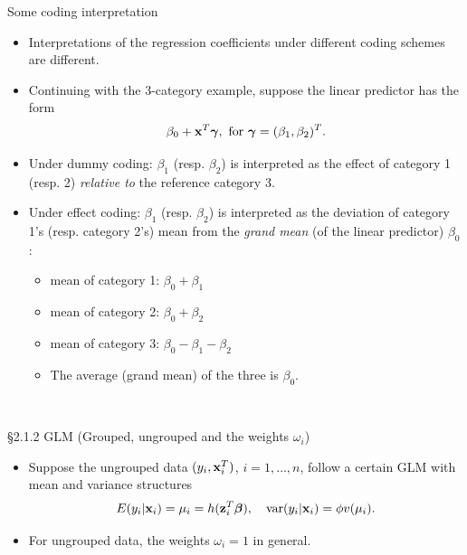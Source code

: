 \documentclass{beamer}
\newcommand{\boldgamma}{{\boldsymbol \gamma}}
\newcommand{\bx}{{\bf x}}
\newenvironment{wideitemize}%
  {\begin{itemize}%
    \setlength{\parskip}{1em}}%
  {\end{itemize}}
\begin{document}
\begin{frame}{Some coding interpretation}
\begin{wideitemize}
\item Interpretations of the regression coefficients under different coding schemes are different. 

\item Continuing with the 3-category example, suppose the linear predictor has the form
\[
\beta_0 + {\bf x}^T \boldgamma, \text{ for } \boldgamma = (\beta_1, \beta_2)^T.
\] 

\item Under dummy coding:  $\beta_1$ (resp. $\beta_2$) is interpreted as the effect of category 1 (resp. 2) \emph{relative to} the reference category 3.  

\item Under effect coding: $\beta_1$ (resp. $\beta_2$)  is interpreted as the deviation of category 1's (resp. category 2's) mean from the \emph{grand mean} (of the linear predictor) $\beta_0$:
\begin{itemize}
\item mean of category 1: $\beta_0 + \beta_1$
\item mean of category 2: $\beta_0 + \beta_2$
\item mean of category 3: $\beta_0 - \beta_1 - \beta_2$
\item The average (grand mean) of the three  is $\beta_0$.
\end{itemize}\

\end{wideitemize}


\end{frame}






\begin{frame}{\S2.1.2 GLM (Grouped, ungrouped and the weights $\omega_i$)}
\noindent
\begin{itemize}



\item Suppose the ungrouped data $(y_i, \bx_i^T)$, $i = 1, \dots, n$, follow a certain GLM with mean and variance structures
\[
E(y_i|\textbf{x}_i)=\mu_i=h(\textbf{z}_i^T\mbox{\boldmath $\beta$}), \quad
\mbox{var}(y_i|\textbf{x}_i)=\phi v(\mu_i).
\]


\item For ungrouped data, the weights $\omega_i = 1$ in general. 





\end{itemize}
\end{frame}
\end{document}

